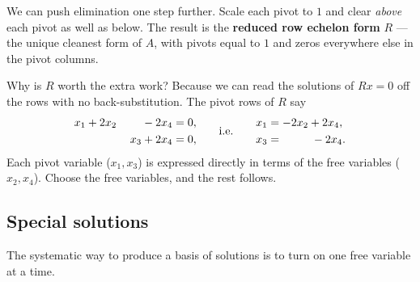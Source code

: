 We can push elimination one step further. Scale each pivot to $1$ and clear \emph{above} each pivot as well as below. The result is the \textbf{reduced row echelon form} $R$ --- the unique cleanest form of $A$, with pivots equal to $1$ and zeros everywhere else in the pivot columns.


Why is $R$ worth the extra work? Because we can read the solutions of $Rx=0$ off the rows with no back-substitution. The pivot rows of $R$ say
\[
   \begin{aligned}
   x_1 + 2x_2 \;\;\;\;\;\;\;\;- 2x_4 &= 0, \\
   \phantom{x_1+2x_2}\;\; x_3 + 2x_4 &= 0,
   \end{aligned}
   \qquad\text{i.e.}\qquad
   \begin{aligned}
   x_1 &= -2x_2 + 2x_4, \\
   x_3 &= \phantom{-2x_2}\; -2x_4 .
   \end{aligned}
\]
Each pivot variable ($x_1,x_3$) is expressed directly in terms of the free variables ($x_2,x_4$). Choose the free variables, and the rest follows.

\subsection{Special solutions}

The systematic way to produce a basis of solutions is to turn on one free variable at a time.


